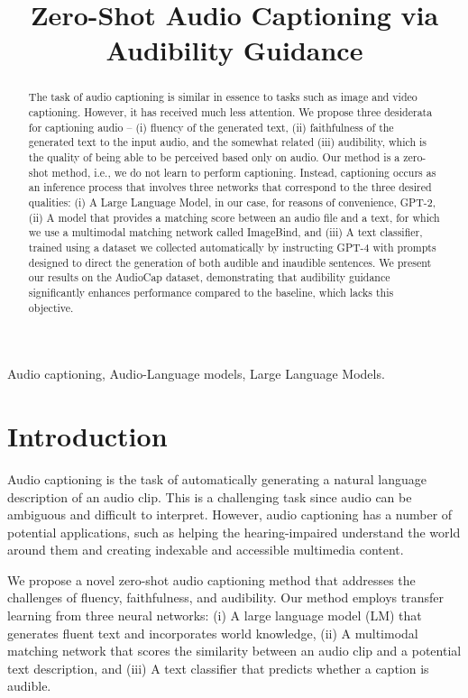 \documentclass{article}
\title{Zero-Shot Audio Captioning via Audibility Guidance}
\begin{document}
\maketitle
\begin{abstract}
The task of audio captioning is similar in essence to tasks such as image and video captioning. However, it has received much less attention. We propose three desiderata for captioning audio -- (i) fluency of the generated text, (ii) faithfulness of the generated text to the input audio, and the somewhat related (iii) audibility, which is the quality of being able to be perceived based only on audio. Our method is a zero-shot method, i.e., we do not learn to perform captioning. Instead, captioning occurs as an inference process that involves three networks that correspond to the three desired qualities: (i) A Large Language Model, in our case, for reasons of convenience, GPT-2, (ii) A model that provides a matching score between an audio file and a text, for which we use a multimodal matching network called ImageBind, and (iii) A text classifier, trained using a dataset we collected automatically by instructing GPT-4 with prompts designed to direct the generation of both audible and inaudible sentences. We present our results on the AudioCap dataset, demonstrating that audibility guidance significantly enhances performance compared to the baseline, which lacks this objective.
\end{abstract}
\begin{keywords}
Audio captioning, Audio-Language models, Large Language Models.
\end{keywords}
\section{Introduction}
\label{sec:intro}

Audio captioning is the task of automatically generating a natural language description of an audio clip. This is a challenging task since audio can be ambiguous and difficult to interpret. However, audio captioning has a number of potential applications, such as helping the hearing-impaired understand the world around them and creating indexable and accessible multimedia content.

We propose a novel zero-shot audio captioning method that addresses the challenges of fluency, faithfulness, and audibility. Our method employs transfer learning from three neural networks: (i) A large language model (LM) that generates fluent text and incorporates world knowledge, (ii) A multimodal matching network that scores the similarity between an audio clip and a potential text description, and (iii) A text classifier that predicts whether a caption is audible.
\end{document}
